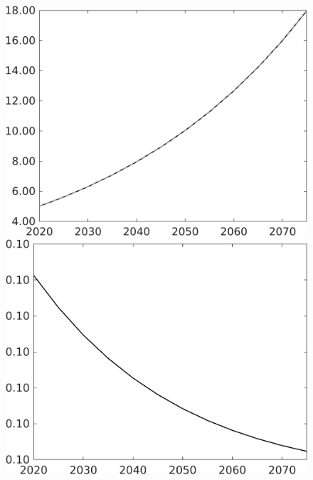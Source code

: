 \documentclass[12pt]{article}
\begin{document}
\begin{figure}[h!!]
\begin{minipage}[]{0.32\textwidth}
	\end{minipage}	
	\begin{minipage}[]{0.32\textwidth}
		\includegraphics[width=1\textwidth]{../../codding_model/own_basedOnFried/optimalPol_010922_revision/figures/all_13Sept22/CompTaul_LFBAU_Reg0_pgpftf_spillover0_nsk0_xgr1_knspil1_sep1_countec0_GovRev0_etaa0.79_lgd0.png}
	\end{minipage}	
\begin{minipage}[]{0.32\textwidth}
\includegraphics[width=1\textwidth]{../../codding_model/own_basedOnFried/optimalPol_010922_revision/figures/all_13Sept22/CompTaul_LFBAUPer_Reg0_pgpftf_spillover0_nsk0_xgr1_knspil1_sep1_countec0_GovRev0_etaa0.79.png}

\end{minipage}
\end{figure}
\end{document}
